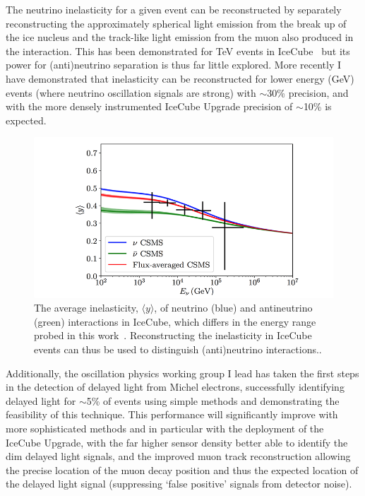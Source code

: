 \documentclass[a4paper,11pt]{article}
\begin{document}
The neutrino inelasticity for a given event can be reconstructed by separately reconstructing the approximately spherical light emission from the break up of the ice nucleus and the track-like light emission from the muon also produced in the interaction. This has been demonstrated for TeV events in IceCube~\cite{Aartsen:2018vez} but its power for (anti)neutrino separation is thus far little explored. More recently I have demonstrated that inelasticity can be reconstructed for lower energy (GeV) events (where neutrino oscillation signals are strong) with $\sim$30\% precision, and with the more densely instrumented IceCube Upgrade precision of $\sim$10\% is expected. 

\begin{figure} %
    \centering
    \includegraphics[trim=2.0cm 0.0cm 1.0cm 0.0cm, clip=true, width=\linewidth]{images/inelasticity.png}
    \caption{The average inelasticity, $\langle y \rangle$, of neutrino (blue) and antineutrino (green) interactions in IceCube, which differs in the energy range probed in this work~\cite{Aartsen:2018vez}. Reconstructing the inelasticity in IceCube events can thus be used to distinguish (anti)neutrino interactions..}
    \label{fig:inelasticity}
\end{figure}

Additionally, the oscillation physics working group I lead has taken the first steps in the detection of delayed light from Michel electrons, successfully identifying delayed light for $\sim$5\% of events using simple methods and demonstrating the feasibility of this technique. This performance will significantly improve with more sophisticated methods and in particular with the deployment of the IceCube Upgrade, with the far higher sensor density better able to identify the dim delayed light signals, and the improved muon track reconstruction allowing the precise location of the muon decay position and thus the expected location of the delayed light signal (suppressing `false positive' signals from detector noise). 
\end{document}

